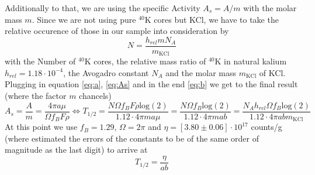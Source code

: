 Additionally to that, we are using the specific Activity $A_s = A / m$ with the molar mass $m$. Since we are not using
pure $^{40}\textrm{K}$ cores but KCl, we have to take the relative occurence of those in our sample into consideration by
\begin{equation}
N = \frac{h_{rel} m N_A}{m_{\mathrm{KCl}}}
\end{equation}
with the Number of $^{40}\textrm{K}$ cores, the relative mass ratio of $^{40}\textrm{K}$ in natural kalium $h_{rel} = 1.18 \cdot 10^{-4}$,
the Avogadro constant $N_A$ and the molar mass $m_{\mathrm{KCl}}$ of KCl.
Plugging in equation \eqref{eq:a}, \eqref{eq:As} and in the end \eqref{eq:b} we get to the final result (where the factor $m$ chancels)
\begin{equation}
A_s = \frac{A}{m} =  \frac{4 \pi a \mu}{\Omega f_B F \rho} \Leftrightarrow T_{1/2} = \frac{N \Omega f_B F \rho \mathrm{log}(2)}{1.12 \cdot 4 \pi m a \mu} 
= \frac{N \Omega f_B \mathrm{log}(2)}{1.12 \cdot 4 \pi m a b} = \frac{N_A h_{rel}\Omega f_B \mathrm{log}(2)}{1.12 \cdot 4 \pi a b m_{\mathrm{KCl}}}
\end{equation}
At this point we use $f_B=1.29$, $\Omega = 2 \pi$ and $\eta = [3.80 \pm 0.06]\cdot 10^{17}$ counts/g (where estimated the errors of the constants to be of the 
same order of magnitude as the last digit) to arrive at
\begin{equation}
T_{1/2} = \frac{\eta}{a b} 
\label{eq:pot_final}
\end{equation}
